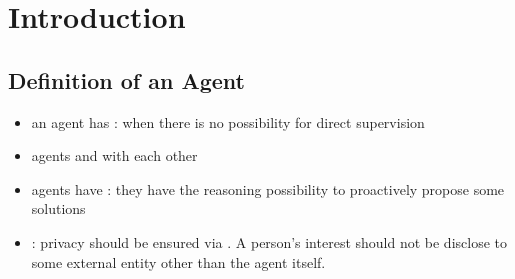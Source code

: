 
\chapter{Introduction}
\minitoc

\section{Definition of an Agent}
\begin{itemize}
\item an agent has : when there is no possibility for direct supervision
\item agents  and  with each other
\item agents have : they have the reasoning possibility to proactively propose some solutions
\item {}: privacy should be ensured via . A person's interest should not be disclose to some external entity other than the agent itself.
\end{itemize}

